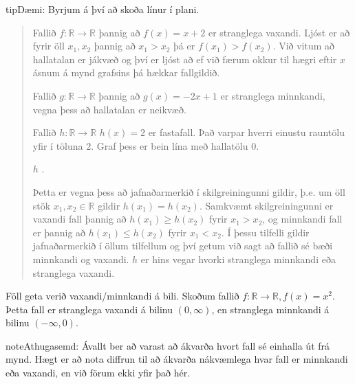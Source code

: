 \documentclass[a4paper,10pt,icelandic]{sphinxmanual}
\begin{document}
\begin{sphinxadmonition}{tip}{Dæmi:}
 Byrjum á því að skoða línur í plani.
\begin{quote}

Fallið \(f: \mathbb{R} \to \mathbb{R}\) þannig að \(f(x)=x+2\) er stranglega vaxandi. Ljóst er að fyrir öll \(x_1,x_2\) þannig að \(x_1>x_2\) þá er \(f(x_1)>f(x_2)\). Við vitum að hallatalan er jákvæð og því er ljóst að ef við færum okkur til hægri eftir \(x\)\sphinxhyphen{}ásnum á mynd grafsins þá hækkar fallgildið.

Fallið \(g: \mathbb{R} \to \mathbb{R}\) þannig að \(g(x)=-2x+1\) er stranglega minnkandi, vegna þess að hallatalan er neikvæð.

Fallið \(h: \mathbb{R} \to \mathbb{R}\) \(h(x)=2\) er fastafall.
Það varpar hverri einustu rauntölu yfir í töluna \(2\).
Graf þess er bein lína með hallatölu \(0\).

 \(h\) .

Þetta er vegna þess að jafnaðarmerkið í skilgreiningunni gildir, þ.e. um öll stök \(x_1, x_2 \in \mathbb{R}\) gildir \(h(x_1)=h(x_2)\).
Samkvæmt skilgreiningunni er vaxandi fall þannig að \(h(x_1) \geq h(x_2)\) fyrir \(x_1>x_2\), og minnkandi fall er þannig að \(h(x_1) \leq h(x_2)\) fyrir \(x_1<x_2\).
Í þessu tilfelli gildir jafnaðarmerkið í öllum tilfellum og því getum við sagt að fallið sé bæði minnkandi og vaxandi.
\(h\) er hins vegar hvorki stranglega minnkandi eða stranglega vaxandi.

\end{quote}

 Föll geta verið vaxandi/minnkandi á bili. Skoðum fallið \(f: \mathbb{R} \to \mathbb{R}, f(x)=x^2\). Þetta fall er stranglega vaxandi á bilinu \((0, \infty)\), en stranglega minnkandi á bilinu \((-\infty, 0)\).
\begin{quote}

\end{quote}
\end{sphinxadmonition}

\begin{sphinxadmonition}{note}{Athugasemd:}
Ávallt ber að varast að ákvarða hvort fall sé einhalla út frá mynd. Hægt er að nota diffrun til að ákvarða nákvæmlega hvar fall er minnkandi eða vaxandi, en við förum ekki yfir það hér.
\end{sphinxadmonition}
\end{document}
